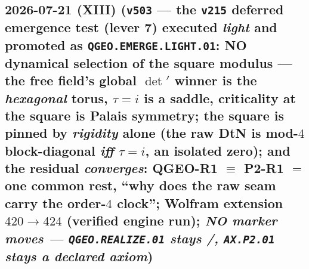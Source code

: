 \subsection*{2026-07-21 (XIII) (\texttt{v503} --- the \texttt{v215} deferred emergence test (lever 7) executed \emph{light} and promoted as \texttt{QGEO.EMERGE.LIGHT.01}: NO dynamical selection of the square modulus --- the free field's global $\det{}'$ winner is the \emph{hexagonal} torus, $\tau{=}i$ is a saddle, criticality at the square is Palais symmetry; the square is pinned by \emph{rigidity} alone (the raw DtN is mod-$4$ block-diagonal \emph{iff} $\tau{=}i$, an isolated zero); and the residual \emph{converges}: QGEO-R1 $\equiv$ P2-R1 $=$ one common rest, ``why does the raw seam carry the order-$4$ clock''; Wolfram extension $420\to424$ (verified engine run); \emph{NO marker moves --- \texttt{QGEO.REALIZE.01} stays \mC/\mO, \texttt{AX.P2.01} stays a declared axiom})}
